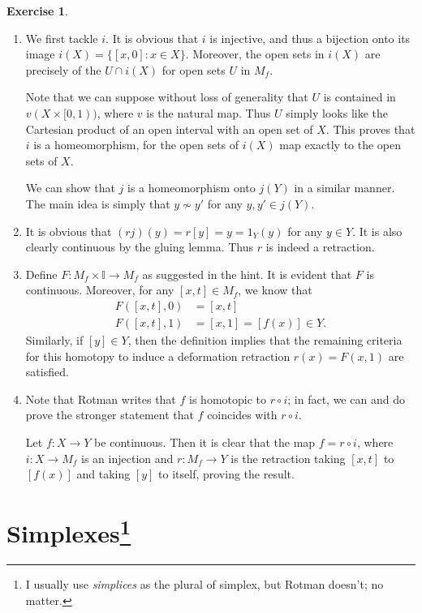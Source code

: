 \documentclass[10pt]{article}
\theoremstyle{definition}
\newtheorem{intex}{Exercise}[section]
\newenvironment{exercise}{\begin{intex}\label{\theintex}}{\end{intex}}
\newcommand*\II{\mathbb I}
\begin{document}
\begin{exercise} \leavevmode
\begin{enumerate}
\item We first tackle $i$. It is obvious that $i$ is injective, and thus a bijection onto its image $i(X)=\{[x,0]:x\in X\}$. Moreover, the open sets in $i(X)$ are precisely of the $U\cap i(X)$ for open sets $U$ in $M_f$. 

Note that we can suppose without loss of generality that $U$ is contained in $v(X\times[0,1))$, where $v$ is the natural map. Thus $U$ simply looks like the Cartesian product of an open interval with an open set of $X$. This proves that $i$ is a homeomorphism, for the open sets of $i(X)$ map exactly to the open sets of $X$. 

We can show that $j$ is a homeomorphism onto $j(Y)$ in a similar manner. The main idea is simply that $y\not\sim y'$ for any $y,y'\in j(Y)$. 

\item It is obvious that $(rj)(y)=r[y]=y=1_Y(y)$ for any $y\in Y$. It is also clearly continuous by the gluing lemma. Thus $r$ is indeed a retraction. 

\item Define $F:M_f\times\II\to M_f$ as suggested in the hint. It is evident that $F$ is continuous. Moreover, for any $[x,t]\in M_f$, we know that \begin{align*}F([x,t],0)&=[x,t]\\F([x,t],1)&=[x,1]=[f(x)]\in Y.\end{align*} Similarly, if $[y]\in Y$, then the definition implies that the remaining criteria for this homotopy to induce a deformation retraction $r(x)=F(x,1)$ are satisfied. 

\item Note that Rotman writes that $f$ is homotopic to $r\circ i$; in fact, we can and do prove the stronger statement that $f$ coincides with $r\circ i$. 

Let $f:X\to Y$ be continuous. Then it is clear that the map $f=r\circ i$, where $i:X\to M_f$ is an injection and $r:M_f\to Y$ is the retraction taking $[x,t]$ to $[f(x)]$ and taking $[y]$ to itself, proving the result. 
\end{enumerate} 
\end{exercise} 

\newpage 

\section[Simplexes]{Simplexes\footnote{I usually use \emph{simplices} as the plural of simplex, but Rotman doesn't; no matter.}}
\end{document}
